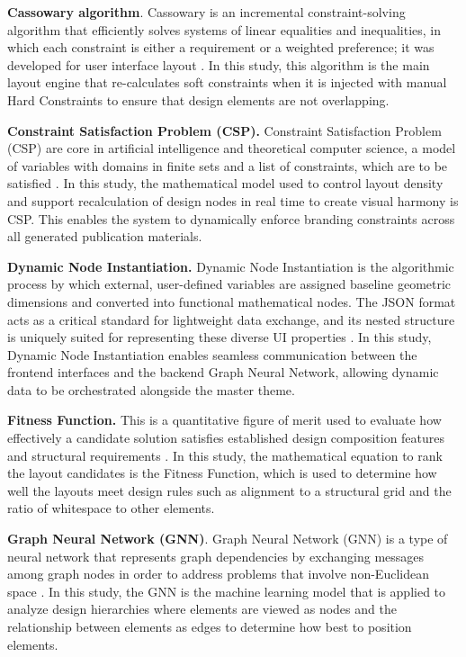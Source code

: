 \begin{refsection}
    \textbf{Cassowary algorithm}. Cassowary is an incremental constraint-solving algorithm that efficiently solves systems of linear equalities and inequalities, in which each constraint is either a requirement or a weighted preference; it was developed for user interface layout \cite{Badros2001Cassowary}. In this study, this algorithm is the main layout engine that re-calculates soft constraints when it is injected with manual Hard Constraints to ensure that design elements are not overlapping.

    \textbf{Constraint Satisfaction Problem (CSP).} Constraint Satisfaction Problem (CSP) are core in artificial intelligence and theoretical computer science, a model of variables with domains in finite sets and a list of constraints, which are to be satisfied \cite{Cenetal2025}. In this study, the mathematical model used to control layout density and support recalculation of design nodes in real time to create visual harmony is CSP. This enables the system to dynamically enforce branding constraints across all generated publication materials.

    \textbf{Dynamic Node Instantiation.} Dynamic Node Instantiation is the algorithmic process by which external, user-defined variables are assigned baseline geometric dimensions and converted into functional mathematical nodes. The JSON format acts as a critical standard for lightweight data exchange, and its nested structure is uniquely suited for representing these diverse UI properties \cite{Berdan2025Formats}. In this study, Dynamic Node Instantiation enables seamless communication between the frontend interfaces and the backend Graph Neural Network, allowing dynamic data to be orchestrated alongside the master theme.

    \textbf{Fitness Function.} This is a quantitative figure of merit used to evaluate how effectively a candidate solution satisfies established design composition features and structural requirements \cite{Fitness2025}. In this study, the mathematical equation to rank the layout candidates is the Fitness Function, which is used to determine how well the layouts meet design rules such as alignment to a structural grid and the ratio of whitespace to other elements.

    \textbf{Graph Neural Network (GNN)}. Graph Neural Network (GNN) is a type of neural network that represents graph dependencies by exchanging messages among graph nodes in order to address problems that involve non-Euclidean space \cite{Boetal2023}. In this study, the GNN is the machine learning model that is applied to analyze design hierarchies where elements are viewed as nodes and the relationship between elements as edges to determine how best to position elements.


\end{refsection}

